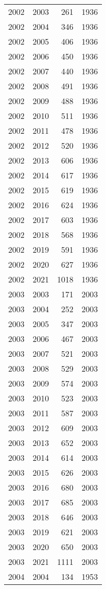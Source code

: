 \documentclass[
  10pt,
  letterpaper,
  DIV=11,
  numbers=noendperiod,
  twoside]{scrartcl}
\begin{document}
\begin{longtable}[]{@{}rrrr@{}}
2002 & 2003 & 261 & 1936 \\
2002 & 2004 & 346 & 1936 \\
2002 & 2005 & 406 & 1936 \\
2002 & 2006 & 450 & 1936 \\
2002 & 2007 & 440 & 1936 \\
2002 & 2008 & 491 & 1936 \\
2002 & 2009 & 488 & 1936 \\
2002 & 2010 & 511 & 1936 \\
2002 & 2011 & 478 & 1936 \\
2002 & 2012 & 520 & 1936 \\
2002 & 2013 & 606 & 1936 \\
2002 & 2014 & 617 & 1936 \\
2002 & 2015 & 619 & 1936 \\
2002 & 2016 & 624 & 1936 \\
2002 & 2017 & 603 & 1936 \\
2002 & 2018 & 568 & 1936 \\
2002 & 2019 & 591 & 1936 \\
2002 & 2020 & 627 & 1936 \\
2002 & 2021 & 1018 & 1936 \\
2003 & 2003 & 171 & 2003 \\
2003 & 2004 & 252 & 2003 \\
2003 & 2005 & 347 & 2003 \\
2003 & 2006 & 467 & 2003 \\
2003 & 2007 & 521 & 2003 \\
2003 & 2008 & 529 & 2003 \\
2003 & 2009 & 574 & 2003 \\
2003 & 2010 & 523 & 2003 \\
2003 & 2011 & 587 & 2003 \\
2003 & 2012 & 609 & 2003 \\
2003 & 2013 & 652 & 2003 \\
2003 & 2014 & 614 & 2003 \\
2003 & 2015 & 626 & 2003 \\
2003 & 2016 & 680 & 2003 \\
2003 & 2017 & 685 & 2003 \\
2003 & 2018 & 646 & 2003 \\
2003 & 2019 & 621 & 2003 \\
2003 & 2020 & 650 & 2003 \\
2003 & 2021 & 1111 & 2003 \\
2004 & 2004 & 134 & 1953 \\

\end{longtable}
\end{document}
